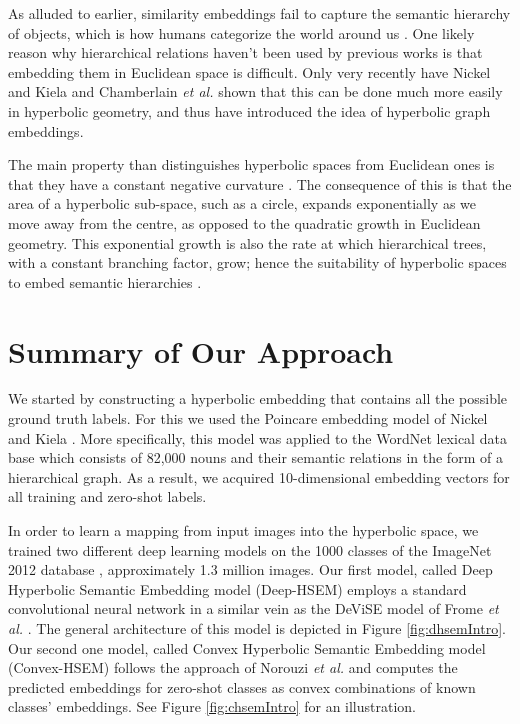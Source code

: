 \documentclass[12pt]{report}
\begin{document}
As alluded to earlier, similarity embeddings fail to capture the semantic hierarchy of objects, which is how humans categorize the world around us \cite{Rosch1976, Joliceur1984}. One likely reason why hierarchical relations haven't been used by previous works is that embedding them in Euclidean space is difficult. Only very recently have Nickel and Kiela \cite{Nickel2017} and Chamberlain \textit{et al.} \cite{Chamberlain2017} shown that this can be done much more easily in hyperbolic geometry, and thus have introduced the idea of hyperbolic graph embeddings.

The main property than distinguishes hyperbolic spaces from Euclidean ones is that they have a constant negative curvature \cite{Greenberg1994}. The consequence of this is that the area of a hyperbolic sub-space, such as a circle, expands exponentially as we move away from the centre, as opposed to the quadratic growth in Euclidean geometry. This exponential growth is also the rate at which hierarchical trees, with a constant branching factor, grow; hence the suitability of hyperbolic spaces to embed semantic hierarchies \cite{Nickel2017, Chamberlain2017}.

\section{Summary of Our Approach}
We started by constructing a hyperbolic embedding that contains all the possible ground truth labels. For this we used the Poincare embedding model of Nickel and Kiela \cite{Nickel2017}. More specifically, this model was applied to the WordNet lexical data base which consists of 82,000 nouns and their semantic relations in the form of a hierarchical graph. As a result, we acquired 10-dimensional embedding vectors for all training and zero-shot labels.

In order to learn a mapping from input images into the hyperbolic space, we trained two different deep learning models on the 1000 classes of the ImageNet 2012 database \cite{JiaDeng2009}, approximately 1.3 million images. Our first model, called Deep Hyperbolic Semantic Embedding model (Deep-HSEM) employs a standard convolutional neural network in a similar vein as the DeViSE model of Frome \textit{et al.} \cite{Frome2013}. The general architecture of this model is depicted in Figure \ref{fig:dhsemIntro}. Our second one model, called Convex Hyperbolic Semantic Embedding model (Convex-HSEM) follows the approach of Norouzi \textit{et al.} \cite{Norouzi2013} and computes the predicted embeddings for zero-shot classes as convex combinations of known classes' embeddings. See Figure \ref{fig:chsemIntro} for an illustration.
\end{document}
